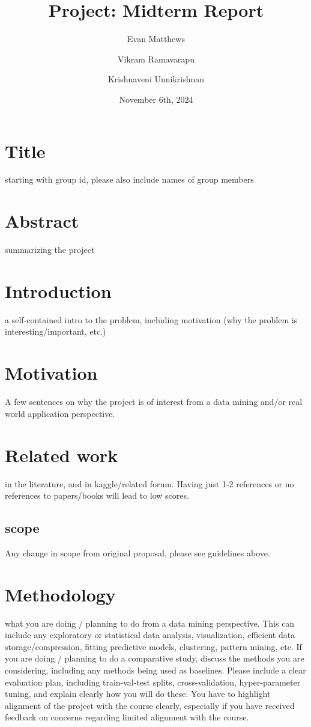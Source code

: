\documentclass[11pt]{extarticle}
\title{Project: Midterm Report}
\author[1]{Evan Matthews}
\author[1]{Vikram Ramavarapu}
\author[1]{Krishnaveni Unnikrishnan}
\affil[1]{CS 412 Group G6}
\date{November 6th, 2024}
\begin{document}
\maketitle

\pagebreak

\section{Title} 
starting with group id, please also include names of group members\cite{*}

\section{Abstract}
summarizing the project 

\section{Introduction}
a self-contained intro to the problem, including motivation 
(why the problem is interesting/important, etc.)

\section{Motivation} 
A few sentences on why the project is of interest from a data mining and/or real world application perspective.

\section{Related work} 
in the literature, and in kaggle/related forum. Having just 1-2 references or no references to papers/books will lead to low scores. 

\subsection{scope} 
Any change in scope from original proposal, please see guidelines above. 

\section{Methodology} 
what you are doing / planning to do from a data mining perspective. This can include any exploratory or statistical data analysis, visualization, efficient data storage/compression, fitting predictive models, clustering, pattern mining, etc.  If you are doing / planning to do a comparative study, discuss the methods you are considering, including any methods being used as baselines.  Please include a clear evaluation plan, including train-val-test splits, cross-validation, hyper-parameter tuning, and explain clearly how you will do these. You have to highlight alignment of the project with the course clearly, especially if you have received feedback on concerns regarding limited alignment with the course. 
\end{document}
